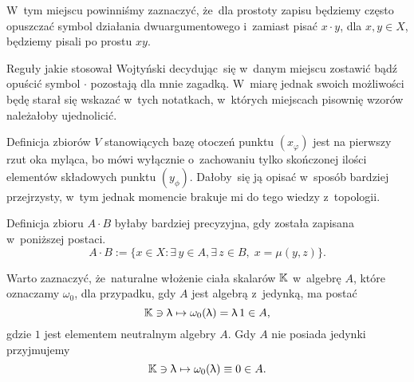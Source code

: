 \documentclass[a4paper,11pt]{article}
\begin{document}

\vspace{0em}


 W~tym miejscu powinniśmy zaznaczyć, że~dla prostoty zapisu
będziemy często opuszczać symbol działania dwuargumentowego i~zamiast pisać
$x \cdot y$, dla $x, y \in X$, będziemy pisali po prostu $x y$.

Reguły jakie stosował Wojtyński decydując~się w~danym miejscu zostawić bądź
opuścić symbol $\cdot$ pozostają dla mnie zagadką. W~miarę jednak swoich
możliwości będę starał się wskazać w~tych notatkach, w~których miejscach
pisownię wzorów należałoby ujednolicić.

\vspace{\spaceFour}





 Definicja zbiorów $V$ stanowiących bazę otoczeń punktu
$( x_{ \varphi } )$ jest na pierwszy rzut oka myląca, bo mówi wyłącznie
o~zachowaniu tylko skończonej ilości elementów składowych punktu
$( y_{ \phi } )$. Dałoby~się ją opisać w~sposób bardziej przejrzysty, w~tym
jednak momencie brakuje mi do tego wiedzy z~topologii.

\vspace{\spaceFour}





 Definicja zbioru $A \cdot B$ byłaby bardziej precyzyjna, gdy
została zapisana w~poniższej postaci.
\begin{equation}
  \label{eq:Wojtynski-01}
  A \cdot B := \{ x \in X : \exists\, y \in A, \exists\, z \in B,\; x = \mu( y, z ) \}.
\end{equation}

\vspace{\spaceFour}





 Warto zaznaczyć, że~naturalne włożenie ciała skalarów
$\mathbb{K}$ w~algebrę $A$, które oznaczamy $\omega_{ 0 }$, dla przypadku, gdy $A$ jest
algebrą z~jedynką, ma postać
\begin{equation}
  \label{eq:Wojtynski-02}
  \mathbb{K} \ni \uplambda \mapsto \omega_{ 0 }( \uplambda ) = \uplambda \, 1 \in A,
\end{equation}
gdzie $1$ jest elementem neutralnym algebry $A$. Gdy $A$ nie posiada jedynki
przyjmujemy
\begin{equation}
  \label{eq:Wojtynski-03}
  \mathbb{K} \ni \uplambda \mapsto \omega_{ 0 }( \uplambda ) \equiv 0 \in A.
\end{equation}
\end{document}
